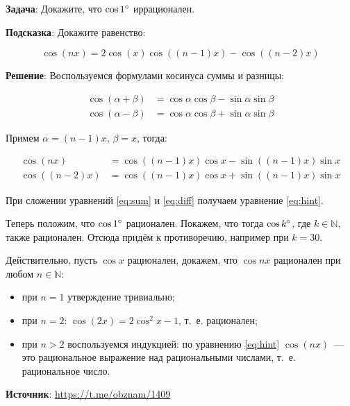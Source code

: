 \documentclass{article} %
\begin{document}
\textbf{Задача}: Докажите, что $\cos 1\degree$ иррационален.

\textbf{Подсказка}: Докажите равенство:

\begin{equation}
\cos(nx) = 2\cos(x) \cos\left( (n-1) x \right) - \cos\left( (n-2) x \right) \label{eq:hint}
\end{equation}

\textbf{Решение}: Воспользуемся формулами косинуса суммы и разницы:

\begin{align*}
  \cos(\alpha + \beta) &= \cos\alpha \cos\beta - \sin\alpha \sin\beta \\
  \cos(\alpha - \beta) &= \cos\alpha \cos\beta + \sin\alpha \sin\beta
\end{align*}

Примем $\alpha = (n-1)x$, $\beta=x$, тогда:

\begin{align}
  \cos(nx) &= \cos((n-1)x) \cos x - \sin((n-1)x) \sin x \label{eq:sum} \\
  \cos((n-2)x) &= \cos((n-1)x) \cos x + \sin((n-1)x) \sin x \label{eq:diff}
\end{align}

При сложении уравнений \ref{eq:sum} и \ref{eq:diff} получаем уравнение \ref{eq:hint}.

Теперь положим, что $\cos 1\degree$ рационален. Покажем, что тогда $\cos k\degree$, где $k \in \mathbb{N}$, также рационален. Отсюда придём к противоречию, например при $k=30$.

Действительно, пусть $\cos x$ рационален, докажем, что $\cos nx$ рационален при любом $n \in \mathbb{N}$:

\begin{itemize}
\item при $n=1$ утверждение тривиально;
\item при $n=2$: $\cos(2x) = 2\cos^2x - 1$, т.~е. рационален;
\item при $n>2$ воспользуемся индукцией: по уравнению \ref{eq:hint} $\cos(nx)$~--- это рациональное выражение над рациональными числами, т.~е. рациональное число.
\end{itemize}

\textbf{Источник}: \url{https://t.me/obznam/1409}
\end{document}
